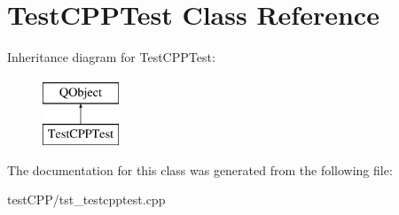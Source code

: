 \hypertarget{classTestCPPTest}{\section{Test\-C\-P\-P\-Test Class Reference}
\label{classTestCPPTest}
}
Inheritance diagram for Test\-C\-P\-P\-Test\-:\begin{figure}[H]
\begin{center}
\leavevmode
\includegraphics[height=2.000000cm]{classTestCPPTest}
\end{center}
\end{figure}


The documentation for this class was generated from the following file\-:\begin{DoxyCompactItemize}
\item 
test\-C\-P\-P/tst\-\_\-testcpptest.\-cpp\end{DoxyCompactItemize}
